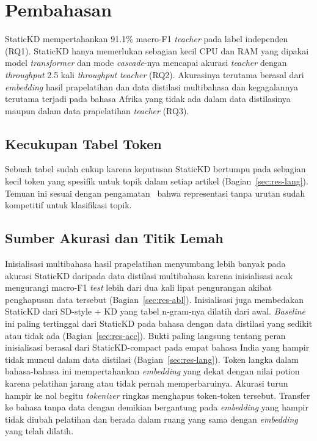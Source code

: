 \documentclass{ieeeaccess}
\newcommand{\en}[1]{\textit{#1}}
\begin{document}
\section{Pembahasan}
\label{sec:discussion}
StaticKD mempertahankan 91.1\% macro-F1 \en{teacher} pada label independen (RQ1). StaticKD hanya memerlukan sebagian kecil CPU dan RAM yang dipakai model \en{transformer} dan mode \en{cascade}-nya mencapai akurasi \en{teacher} dengan \en{throughput} 2.5 kali \en{throughput} \en{teacher} (RQ2). Akurasinya terutama berasal dari \en{embedding} hasil prapelatihan dan data distilasi multibahasa dan kegagalannya terutama terjadi pada bahasa Afrika yang tidak ada dalam data distilasinya maupun dalam data prapelatihan \en{teacher} (RQ3).

\subsection{Kecukupan Tabel Token}
Sebuah tabel sudah cukup karena keputusan StaticKD bertumpu pada sebagian kecil token yang spesifik untuk topik dalam setiap artikel (Bagian~\ref{sec:res-lang}). Temuan ini sesuai dengan pengamatan~\cite{galke2022bow} bahwa representasi tanpa urutan sudah kompetitif untuk klasifikasi topik.

\subsection{Sumber Akurasi dan Titik Lemah}
Inisialisasi multibahasa hasil prapelatihan menyumbang lebih banyak pada akurasi StaticKD daripada data distilasi multibahasa karena inisialisasi acak mengurangi macro-F1 \en{test} lebih dari dua kali lipat pengurangan akibat penghapusan data tersebut (Bagian~\ref{sec:res-abl}). Inisialisasi juga membedakan StaticKD dari SD-style + KD yang tabel n-gram-nya dilatih dari awal. \en{Baseline} ini paling tertinggal dari StaticKD pada bahasa dengan data distilasi yang sedikit atau tidak ada (Bagian~\ref{sec:res-acc}). Bukti paling langsung tentang peran inisialisasi berasal dari StaticKD-compact pada empat bahasa India yang hampir tidak muncul dalam data distilasi (Bagian~\ref{sec:res-lang}). Token langka dalam bahasa-bahasa ini mempertahankan \en{embedding} yang dekat dengan nilai potion karena pelatihan jarang atau tidak pernah memperbaruinya. Akurasi turun hampir ke nol begitu \en{tokenizer} ringkas menghapus token-token tersebut. Transfer ke bahasa tanpa data dengan demikian bergantung pada \en{embedding} yang hampir tidak diubah pelatihan dan berada dalam ruang yang sama dengan \en{embedding} yang telah dilatih.
\end{document}
